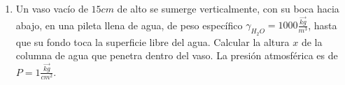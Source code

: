 \documentclass[../main]{subfiles}
\begin{document}
\begin{enumerate}

  \item Un vaso vacío de $15cm$ de alto se sumerge verticalmente, con
    su boca hacia abajo, en una pileta llena de agua, de peso específico
    $\gamma_{H_2O}=1000\frac{\vec{kg}}{m^3}$, hasta que su fondo toca la
    superficie libre del agua. Calcular la altura $x$ de la columna de
    agua que penetra dentro del vaso. La presión atmosférica es de
    $P=1\frac{\vec{kg}}{cm^2}$.
\end{enumerate}
\end{document}
